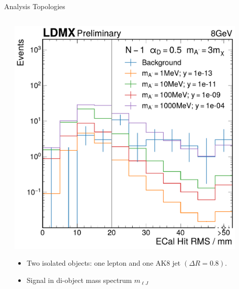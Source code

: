 \documentclass[aspectratio=169]{beamer}
\begin{document}
\begin{frame}[t]{Analysis Topologies}
\begin{columns}[t]
\begin{column}{0.32\textwidth}
{      }
    \end{column}
    \begin{column}{0.32\textwidth}
      \centering
      \includegraphics[width=0.9\textwidth]{../figures/ldmx/analysis/nm1-ecal-rms-8gev-1e13norm.pdf}
      {
        \footnotesize
        \begin{itemize}
          \item Two isolated objects: one lepton and one AK8 jet $\left(\Delta R = 0.8\right)$.
          \item Signal in di-object mass spectrum $m_{\ell J}$
        \end{itemize}
      }
    \end{column}
  \end{columns}
\end{frame}
\end{document}
